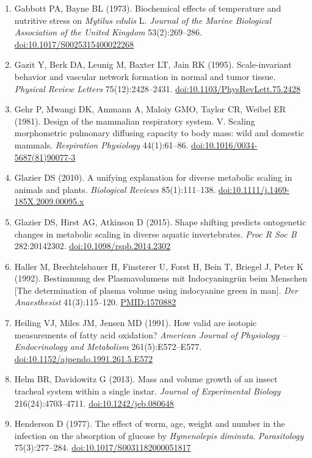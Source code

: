 \begin{small}
\begin{enumerate}[label={},leftmargin=1.2em,itemindent=-1.2em,itemsep=0.15em]
\item Gabbott PA, Bayne BL (1973). Biochemical effects of temperature and nutritive stress on \emph{Mytilus edulis} L. \emph{Journal of the Marine Biological Association of the United Kingdom} 53(2):269–286. \href{https://doi.org/10.1017/S0025315400022268}{doi:10.1017/S0025315400022268}
\item Gazit Y, Berk DA, Leunig M, Baxter LT, Jain RK (1995). Scale-invariant behavior and vascular network formation in normal and tumor tissue. \emph{Physical Review Letters} 75(12):2428–2431. \href{https://doi.org/10.1103/PhysRevLett.75.2428}{doi:10.1103/PhysRevLett.75.2428}
\item Gehr P, Mwangi DK, Ammann A, Maloiy GMO, Taylor CR, Weibel ER (1981). Design of the mammalian respiratory system. V. Scaling morphometric pulmonary diffusing capacity to body mass: wild and domestic mammals. \emph{Respiration Physiology} 44(1):61–86. \href{https://doi.org/10.1016/0034-5687(81)90077-3}{doi:10.1016/0034-5687(81)90077-3}
\item Glazier DS (2010). A unifying explanation for diverse metabolic scaling in animals and plants. \emph{Biological Reviews} 85(1):111–138. \href{https://doi.org/10.1111/j.1469-185X.2009.00095.x}{doi:10.1111/j.1469-185X.2009.00095.x}
\item Glazier DS, Hirst AG, Atkinson D (2015). Shape shifting predicts ontogenetic changes in metabolic scaling in diverse aquatic invertebrates. \emph{Proc R Soc B} 282:20142302. \href{https://doi.org/10.1098/rspb.2014.2302}{doi:10.1098/rspb.2014.2302}
\item Haller M, Brechtelsbauer H, Finsterer U, Forst H, Bein T, Briegel J, Peter K (1992). Bestimmung des Plasmavolumens mit Indocyaningrün beim Menschen [The determination of plasma volume using indocyanine green in man]. \emph{Der Anaesthesist} 41(3):115–120. \href{https://pubmed.ncbi.nlm.nih.gov/1570882/}{PMID:1570882}
\item Heiling VJ, Miles JM, Jensen MD (1991). How valid are isotopic measurements of fatty acid oxidation? \emph{American Journal of Physiology – Endocrinology and Metabolism} 261(5):E572–E577. \href{https://doi.org/10.1152/ajpendo.1991.261.5.E572}{doi:10.1152/ajpendo.1991.261.5.E572}
\item Helm BR, Davidowitz G (2013). Mass and volume growth of an insect tracheal system within a single instar. \emph{Journal of Experimental Biology} 216(24):4703–4711. \href{https://doi.org/10.1242/jeb.080648}{doi:10.1242/jeb.080648}
\item Henderson D (1977). The effect of worm, age, weight and number in the infection on the absorption of glucose by \emph{Hymenolepis diminuta}. \emph{Parasitology} 75(3):277–284. \href{https://doi.org/10.1017/S0031182000051817}{doi:10.1017/S0031182000051817}

\end{enumerate}
\end{small}

